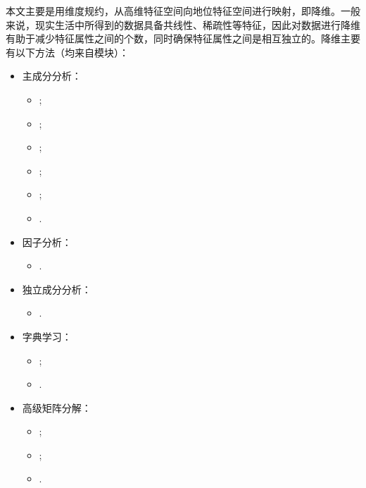 本文主要是用维度规约，从高维特征空间向地位特征空间进行映射，即降维。一般来说，现实生活中所得到的数据具备共线性、稀疏性等特征，因此对数据进行降维有助于减少特征属性之间的个数，同时确保特征属性之间是相互独立的。降维主要有以下方法（均来自模块）\cite{scikit-learn,sklearn_api,DataAnalyst2019机器学习之sklearn中的降维算法,Cyrille2015sne}：

\begin{itemize}
    \item 主成分分析：
        \begin{itemize}
            \item {};
            \item {};
            \item {};
            \item {};
            \item {};
            \item {}.
        \end{itemize}
    \item 因子分析：
        \begin{itemize}
            \item {}.
        \end{itemize}
    \item 独立成分分析：
        \begin{itemize}
            \item {}.
        \end{itemize}
    \item 字典学习：
        \begin{itemize}
            \item {};
            \item {}.
        \end{itemize}
    \item 高级矩阵分解：
        \begin{itemize}
            \item {};
            \item {};
            \item {}.
        \end{itemize}
\end{itemize}


